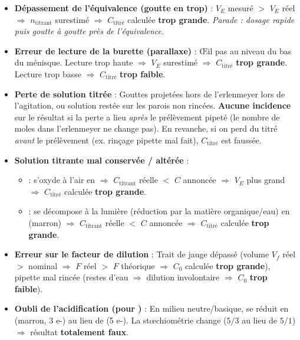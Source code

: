 \documentclass[11pt]{article}
\begin{document}
\begin{itemize}
\item \textbf{Dépassement de l'équivalence (goutte en trop)} : $V_E$ mesuré $>$ $V_E$ réel $\Rightarrow$ $n_{\text{titrant}}$ surestimé $\Rightarrow$ $C_{\text{titré}}$ calculée \textbf{trop grande}. \emph{Parade : dosage rapide puis goutte à goutte près de l'équivalence.}
\item \textbf{Erreur de lecture de la burette (parallaxe)} : Œil pas au niveau du bas du ménisque. Lecture trop haute $\Rightarrow$ $V_E$ surestimé $\Rightarrow$ $C_{\text{titré}}$ \textbf{trop grande}. Lecture trop basse $\Rightarrow$ $C_{\text{titré}}$ \textbf{trop faible}.
\item \textbf{Perte de solution titrée} : Gouttes projetées hors de l'erlenmeyer lors de l'agitation, ou solution restée sur les parois non rincées. \textbf{Aucune incidence} sur le résultat si la perte a lieu \emph{après} le prélèvement pipeté (le nombre de moles dans l'erlenmeyer ne change pas). En revanche, si on perd du titré \emph{avant} le prélèvement (ex. rinçage pipette mal fait), $C_{\text{titré}}$ est faussée.
\item \textbf{Solution titrante mal conservée / altérée} :
      \begin{itemize}
      \item {} : s'oxyde à l'air en  $\Rightarrow$ $C_{\text{titrant}}$ réelle $<$ $C$ annoncée $\Rightarrow$ $V_E$ plus grand $\Rightarrow$ $C_{\text{titré}}$ calculée \textbf{trop grande}.
      \item {} : se décompose à la lumière (réduction par la matière organique/eau) en  (marron) $\Rightarrow$ $C_{\text{titrant}}$ réelle $<$ $C$ annoncée $\Rightarrow$ $C_{\text{titré}}$ calculée \textbf{trop grande}.
      \end{itemize}
\item \textbf{Erreur sur le facteur de dilution} : Trait de jauge dépassé (volume $V_f$ réel $>$ nominal $\Rightarrow$ $F$ réel $>$ $F$ théorique $\Rightarrow$ $C_0$ calculée \textbf{trop grande}), pipette mal rincée (restes d'eau $\Rightarrow$ dilution involontaire $\Rightarrow$ $C_0$ \textbf{trop faible}).
\item \textbf{Oubli de l'acidification (pour )} : En milieu neutre/basique,  se réduit en  (marron, 3 e-) au lieu de  (5 e-). La stœchiométrie change ($5/3$ au lieu de $5/1$) $\Rightarrow$ résultat \textbf{totalement faux}.
\end{itemize}
\end{document}
